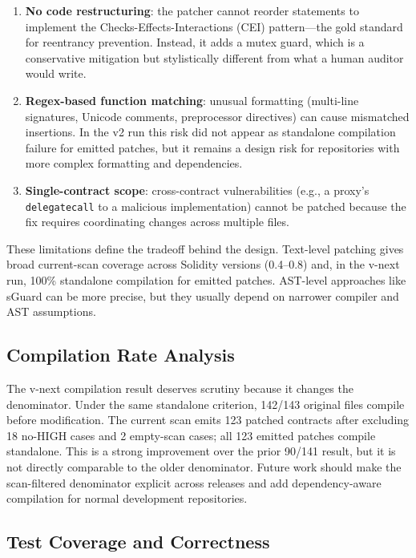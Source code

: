 \documentclass[conference]{IEEEtran}
\begin{document}
\begin{enumerate}
    \item \textbf{No code restructuring}: the patcher cannot reorder statements to implement the Checks-Effects-Interactions (CEI) pattern---the gold standard for reentrancy prevention. Instead, it adds a mutex guard, which is a conservative mitigation but stylistically different from what a human auditor would write.
    \item \textbf{Regex-based function matching}: unusual formatting (multi-line signatures, Unicode comments, preprocessor directives) can cause mismatched insertions. In the v2 run this risk did not appear as standalone compilation failure for emitted patches, but it remains a design risk for repositories with more complex formatting and dependencies.
    \item \textbf{Single-contract scope}: cross-contract vulnerabilities (e.g., a proxy's \texttt{delegatecall} to a malicious implementation) cannot be patched because the fix requires coordinating changes across multiple files.
\end{enumerate}

These limitations define the tradeoff behind the design. Text-level patching gives broad current-scan coverage across Solidity versions (0.4--0.8) and, in the v-next run, 100\% standalone compilation for emitted patches. AST-level approaches like sGuard can be more precise, but they usually depend on narrower compiler and AST assumptions.

\subsection{Compilation Rate Analysis}

The v-next compilation result deserves scrutiny because it changes the denominator. Under the same standalone criterion, 142/143 original files compile before modification. The current scan emits 123 patched contracts after excluding 18 no-HIGH cases and 2 empty-scan cases; all 123 emitted patches compile standalone. This is a strong improvement over the prior 90/141 result, but it is not directly comparable to the older denominator. Future work should make the scan-filtered denominator explicit across releases and add dependency-aware compilation for normal development repositories.

\subsection{Test Coverage and Correctness}
\end{document}
